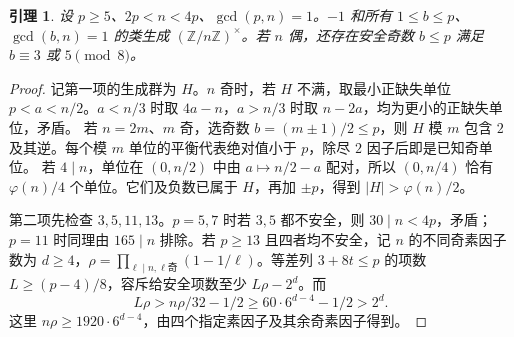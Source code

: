 \documentclass[11pt,a4paper]{article}
\newcommand{\Z}{\mathbb Z}
\newtheorem{lemma}[theorem]{引理}
\theoremstyle{definition}
\numberwithin{equation}{section}
\begin{document}
\begin{lemma}\label{lem:small-units}
设 $p\ge5$、$2p<n<4p$、$\gcd(p,n)=1$。$-1$ 和所有 $1\le b\le p$、$\gcd(b,n)=1$ 的类生成 $(\Z/n\Z)^\times$。若 $n$ 偶，还存在安全奇数 $b\le p$ 满足 $b\equiv3$ 或 $5\pmod8$。
\end{lemma}
\begin{proof}
记第一项的生成群为 $H$。$n$ 奇时，若 $H$ 不满，取最小正缺失单位 $p<a<n/2$。$a<n/3$ 时取 $4a-n$，$a>n/3$ 时取 $n-2a$，均为更小的正缺失单位，矛盾。
若 $n=2m$、$m$ 奇，选奇数 $b=(m\pm1)/2\le p$，则 $H$ 模 $m$ 包含 $2$ 及其逆。每个模 $m$ 单位的平衡代表绝对值小于 $p$，除尽 $2$ 因子后即是已知奇单位。
若 $4\mid n$，单位在 $(0,n/2)$ 中由 $a\mapsto n/2-a$ 配对，所以 $(0,n/4)$ 恰有 $\varphi(n)/4$ 个单位。它们及负数已属于 $H$，再加 $\pm p$，得到 $|H|>\varphi(n)/2$。

第二项先检查 $3,5,11,13$。$p=5,7$ 时若 $3,5$ 都不安全，则 $30\mid n<4p$，矛盾；$p=11$ 时同理由 $165\mid n$ 排除。若 $p\ge13$ 且四者均不安全，记 $n$ 的不同奇素因子数为 $d\ge4$，$\rho=\prod_{\ell\mid n,\ell\text{奇}}(1-1/\ell)$。等差列 $3+8t\le p$ 的项数 $L\ge(p-4)/8$，容斥给安全项数至少 $L\rho-2^d$。而
\[
L\rho>n\rho/32-1/2\ge60\cdot6^{d-4}-1/2>2^d.
\]
这里 $n\rho\ge1920\cdot6^{d-4}$，由四个指定素因子及其余奇素因子得到。
\end{proof}
\end{document}
